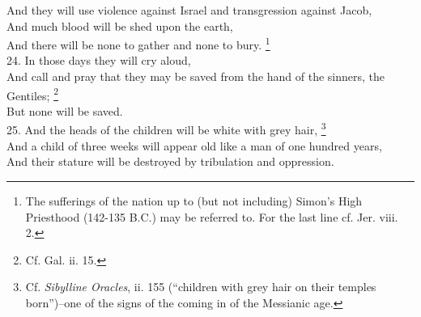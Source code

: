 And they will use violence against Israel and transgression against Jacob,\\
And much blood will be shed upon the earth,\\
And there will be none to gather and none to bury. \footnote{The sufferings of the nation up to (but not including) Simon's High Priesthood (142-135 B.C.) may be referred to. For the last line cf. Jer. viii. 2.}\\
24. In those days they will cry aloud,\\
And call and pray that they may be saved from the hand of the sinners, the Gentiles; \footnote{Cf. Gal. ii. 15.}\\
But none will be saved.\\
25. And the heads of the children will be white with grey hair, \footnote{Cf. \emph{Sibylline Oracles}, ii. 155 (``children with grey hair on their temples born'')--one of the signs of the coming in of the Messianic age.}\\
And a child of three weeks will appear old like a man of one hundred years,\\
And their stature will be destroyed by tribulation and oppression.


